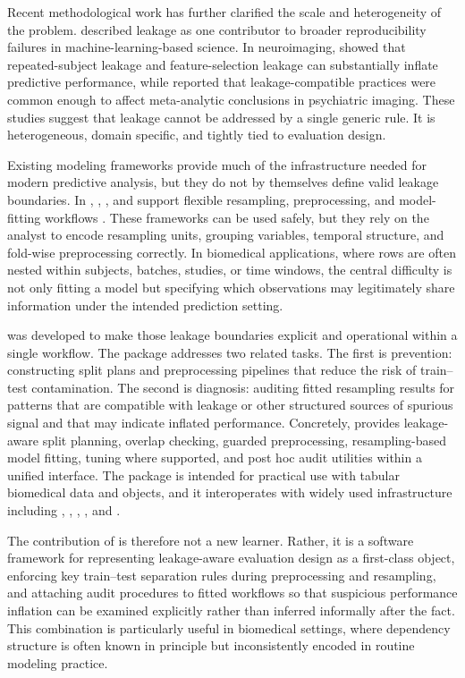 \documentclass[article,shortnames]{jss}
\begin{document}
Recent methodological work has further clarified the scale and heterogeneity of the problem. \citet{kapoor2023} described leakage as one contributor to broader reproducibility failures in machine-learning-based science. In neuroimaging, \citet{rosenblatt2024} showed that repeated-subject leakage and feature-selection leakage can substantially inflate predictive performance, while \citet{vandemortel2025} reported that leakage-compatible practices were common enough to affect meta-analytic conclusions in psychiatric imaging. These studies suggest that leakage cannot be addressed by a single generic rule. It is heterogeneous, domain specific, and tightly tied to evaluation design.

Existing modeling frameworks provide much of the infrastructure needed for modern predictive analysis, but they do not by themselves define valid leakage boundaries. In  \citep{R}, , , and  support flexible resampling, preprocessing, and model-fitting workflows \citep{kuhn2008, kuhn2020, lang2019, bischl2024}. These frameworks can be used safely, but they rely on the analyst to encode resampling units, grouping variables, temporal structure, and fold-wise preprocessing correctly. In biomedical applications, where rows are often nested within subjects, batches, studies, or time windows, the central difficulty is not only fitting a model but specifying which observations may legitimately share information under the intended prediction setting.

 was developed to make those leakage boundaries explicit and operational within a single workflow. The package addresses two related tasks. The first is prevention: constructing split plans and preprocessing pipelines that reduce the risk of train--test contamination. The second is diagnosis: auditing fitted resampling results for patterns that are compatible with leakage or other structured sources of spurious signal and that may indicate inflated performance. Concretely,  provides leakage-aware split planning, overlap checking, guarded preprocessing, resampling-based model fitting, tuning where supported, and post hoc audit utilities within a unified  interface. The package is intended for practical use with tabular biomedical data and  objects, and it interoperates with widely used  infrastructure including , , , , and .

The contribution of  is therefore not a new learner. Rather, it is a software framework for representing leakage-aware evaluation design as a first-class object, enforcing key train--test separation rules during preprocessing and resampling, and attaching audit procedures to fitted workflows so that suspicious performance inflation can be examined explicitly rather than inferred informally after the fact. This combination is particularly useful in biomedical settings, where dependency structure is often known in principle but inconsistently encoded in routine modeling practice.
\end{document}
